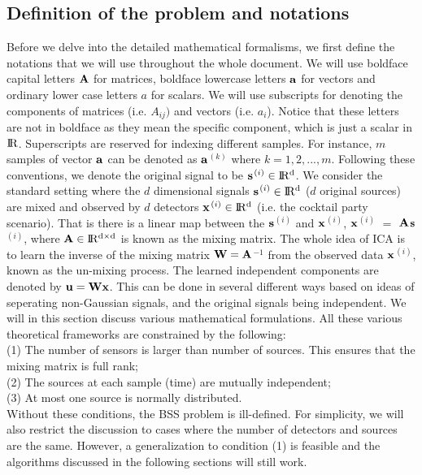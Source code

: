 \documentclass[aps,prl,preprint,superscriptaddress]{revtex4-2}
\begin{document}
\subsection{Definition of the problem and notations}
Before we delve into the detailed mathematical formalisms, we first define the notations that we will use throughout the whole document. We will use boldface capital letters $\bf{A}$ for matrices, boldface lowercase letters $\bf{a}$ for vectors and ordinary lower case letters $a$ for scalars. We will use subscripts for denoting the components of matrices (i.e. $A_{ij})$ and vectors (i.e. $a_{i}$). Notice that these letters are not in boldface as they mean the specific component, which is just a scalar in $ \rm I\!R$. Superscripts are reserved for indexing different samples. For instance, $m$ samples of vector $\bf{a}$ can be denoted as $\bf{a}$$^{(k)}$ where $k = 1, 2, ..., m$. Following these conventions, we denote the original signal to be $\bf{s}$$^{(i)} \in \rm I\!R^{d}$. We consider the standard setting where the $d$ dimensional signals $\bf{s}$$^{(i)} \in \rm I\!R^{d}$ ($d$ original sources) are mixed and observed by $d$ detectors $\bf{x}$$^{(i)} \in \rm I\!R^{d}$ (i.e. the cocktail party scenario). That is there is a linear map between the $\bf{s}$$^{(i)}$ and $\bf{x}$$^{(i)}$, $\bf{x}$$^{(i)}$ $=$ $\bf{A}$$\bf{s}$$^{(i)}$, where $\bf{A} \in \rm I\!R^{d\times d}$ is known as the mixing matrix. The whole idea of ICA is to learn the inverse of the mixing matrix $\bf{W} = \bf{A}$$^{-1}$ from the observed data $\bf{x}$$^{(i)}$, known as the un-mixing process. The learned independent components are denoted by $\bf{u} = \bf{W}\bf{x}$. This can be done in several different ways based on ideas of seperating non-Gaussian signals, and the original signals being independent. We will in this section discuss various mathematical formulations. All these various theoretical frameworks are constrained by the following:\\
(1) The number of sensors is larger than number of sources. This ensures that the mixing matrix is full rank; \\
(2) The sources at each sample (time) are mutually independent; \\
(3) At most one source is normally distributed. \\
Without these conditions, the BSS problem is ill-defined. For simplicity, we will also restrict the discussion to cases where the number of detectors and sources are the same. However, a generalization to condition (1) is feasible and the algorithms discussed in the following sections will still work.
\end{document}

